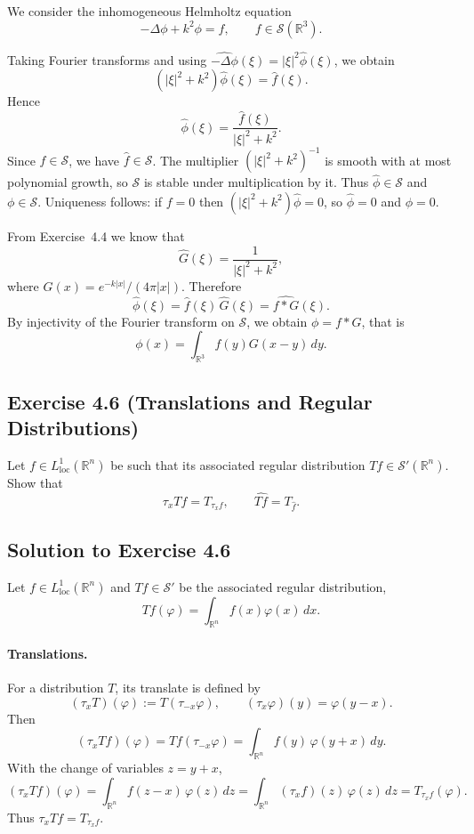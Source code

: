 \documentclass[12pt,a4paper]{article}
\theoremstyle{plain}
\theoremstyle{definition}
\theoremstyle{remark}
\theoremstyle{remark}
\begin{document}
We consider the inhomogeneous Helmholtz equation
\[
-\Delta\phi + k^{2}\phi = f, \qquad f\in\mathcal{S}(\mathbb{R}^3).
\]

Taking Fourier transforms and using
$\widehat{-\Delta\phi}(\xi)=|\xi|^2\widehat{\phi}(\xi)$, we obtain
\[
(|\xi|^2 + k^{2})\widehat{\phi}(\xi) = \widehat{f}(\xi).
\]
Hence
\[
\widehat{\phi}(\xi) = \frac{\widehat{f}(\xi)}{|\xi|^2 + k^{2}}.
\]
Since $f\in\mathcal{S}$, we have $\widehat{f}\in\mathcal{S}$.  The multiplier
$(|\xi|^2 + k^{2})^{-1}$ is smooth with at most polynomial growth, so
$\mathcal{S}$ is stable under multiplication by it.  Thus
$\widehat{\phi}\in\mathcal{S}$ and $\phi\in\mathcal{S}$.  Uniqueness follows:
if $f=0$ then $(|\xi|^2+k^{2})\widehat{\phi}=0$, so $\widehat{\phi}=0$ and
$\phi=0$.

From Exercise~4.4 we know that
\[
\widehat{G}(\xi) = \frac{1}{|\xi|^2 + k^{2}},
\]
where $G(x)=e^{-k|x|}/(4\pi|x|)$.  Therefore
\[
\widehat{\phi}(\xi)
= \widehat{f}(\xi)\,\widehat{G}(\xi)
= \widehat{f*G}(\xi).
\]
By injectivity of the Fourier transform on $\mathcal{S}$, we obtain
$\phi = f*G$, that is
\[
\phi(x) = \int_{\mathbb{R}^3} f(y)G(x-y)\,dy.
\]

\bigskip

\subsection*{Exercise 4.6 (Translations and Regular Distributions)}

Let $f\in L^{1}_{\mathrm{loc}}(\mathbb{R}^n)$ be such that its associated
regular distribution $Tf\in\mathcal{S}'(\mathbb{R}^n)$.  Show that
\[
\tau_x Tf = T_{\tau_x f},
\qquad
\widehat{Tf} = T_{\widehat{f}}.
\]

\subsection*{Solution to Exercise 4.6}

Let $f\in L^{1}_{\mathrm{loc}}(\mathbb{R}^n)$ and $Tf\in\mathcal{S}'$ be the
associated regular distribution,
\[
Tf(\varphi) = \int_{\mathbb{R}^n} f(x)\varphi(x)\,dx.
\]

\paragraph{Translations.}
For a distribution $T$, its translate is defined by
\[
(\tau_x T)(\varphi) := T(\tau_{-x}\varphi),
\qquad (\tau_x\varphi)(y)=\varphi(y-x).
\]
Then
\[
(\tau_x Tf)(\varphi)
= Tf(\tau_{-x}\varphi)
= \int_{\mathbb{R}^n} f(y)\,\varphi(y+x)\,dy.
\]
With the change of variables $z=y+x$,
\[
(\tau_x Tf)(\varphi)
= \int_{\mathbb{R}^n} f(z-x)\,\varphi(z)\,dz
= \int_{\mathbb{R}^n} (\tau_x f)(z)\,\varphi(z)\,dz
= T_{\tau_x f}(\varphi).
\]
Thus $\tau_x Tf = T_{\tau_x f}$.
\end{document}
